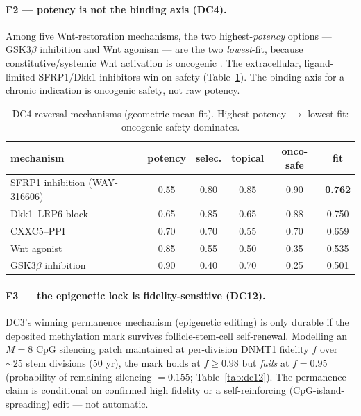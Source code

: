\documentclass[11pt,a4paper]{article}
\begin{document}
\paragraph{F2 --- potency is not the binding axis (DC4).}
Among five Wnt-restoration mechanisms, the two highest-\emph{potency} options ---
GSK3$\beta$ inhibition and Wnt agonism --- are the two \emph{lowest}-fit, because
constitutive/systemic Wnt activation is oncogenic \citep{clevers2012}. The
extracellular, ligand-limited SFRP1/Dkk1 inhibitors win on safety
(Table~\ref{tab:dc4}). The binding axis for a chronic indication is oncogenic
safety, not raw potency.

\begin{table}[h]
\centering\small
\begin{tabular}{lccccc}
\toprule
\textbf{mechanism} & potency & selec. & topical & onco-safe & \textbf{fit} \\
\midrule
SFRP1 inhibition (WAY-316606) & 0.55 & 0.80 & 0.85 & 0.90 & \textbf{0.762} \\
Dkk1--LRP6 block              & 0.65 & 0.85 & 0.65 & 0.88 & 0.750 \\
CXXC5--PPI                    & 0.70 & 0.70 & 0.55 & 0.70 & 0.659 \\
Wnt agonist                   & 0.85 & 0.55 & 0.50 & 0.35 & 0.535 \\
GSK3$\beta$ inhibition        & 0.90 & 0.40 & 0.70 & 0.25 & 0.501 \\
\bottomrule
\end{tabular}
\caption{DC4 reversal mechanisms (geometric-mean fit). Highest potency
$\to$ lowest fit: oncogenic safety dominates.}
\label{tab:dc4}
\end{table}

\paragraph{F3 --- the epigenetic lock is fidelity-sensitive (DC12).}
DC3's winning permanence mechanism (epigenetic editing) is only durable if the
deposited methylation mark survives follicle-stem-cell self-renewal. Modelling an
$M=8$ CpG silencing patch maintained at per-division DNMT1 fidelity $f$ over
${\sim}25$ stem divisions (50 yr), the mark holds at $f\geq 0.98$ but \emph{fails}
at $f=0.95$ (probability of remaining silencing $=0.155$; Table~\ref{tab:dc12}).
The permanence claim is conditional on confirmed high fidelity or a self-reinforcing
(CpG-island-spreading) edit --- not automatic.
\end{document}
